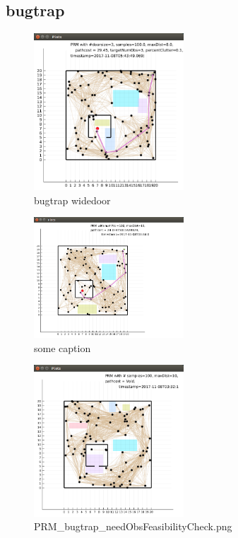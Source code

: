 \documentclass[a4paper]{article}
\begin{document}
\subsection{  bugtrap }

\begin{figure} \centering
    \includegraphics[width=0.5\textwidth]{./PRM_bugtrap_widedoor.png}
     \caption{bugtrap widedoor} 
 \end{figure}

\begin{figure} \centering
    \includegraphics[width=0.5\textwidth]{./PRM_bugtrap.png}
     \caption{some caption} 
 \end{figure}


\begin{figure} \centering
    \includegraphics[width=0.5\textwidth]{./PRM_bugtrap_needObsFeasibilityCheck.png}
     \caption{PRM\_bugtrap\_needObsFeasibilityCheck.png} 
 \end{figure}
\end{document}
